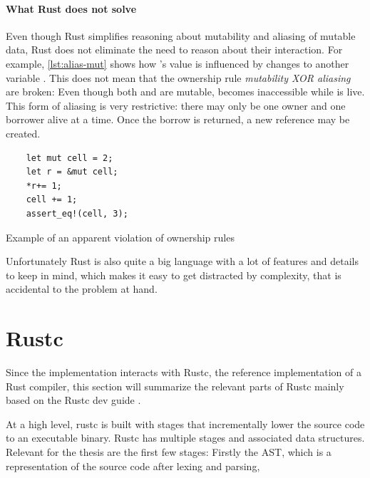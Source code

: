 \documentclass[twoside, english]{sdqthesis}
\theoremstyle{definition}
\begin{document}
\paragraph*{What Rust does not solve} Even though Rust simplifies reasoning about mutability and aliasing of mutable data, Rust does not eliminate the need to reason about their interaction. For example, \cref{lst:alias-mut} shows how 's value is influenced by changes to another variable . This does not mean that the ownership rule  \textit{mutability XOR aliasing} are broken: Even though both  and  are mutable,  becomes inaccessible while  is live.
This form of aliasing is very restrictive: there may only be one owner and one borrower alive at a time. Once the borrow is returned, a new reference may be created.

\begin{listing}[h]
  \begin{verbatim}
    let mut cell = 2;
    let r = &mut cell;
    *r+= 1;
    cell += 1;
    assert_eq!(cell, 3);
  \end{verbatim}
  \caption{Example of an apparent violation of ownership rules}
  \label{lst:alias-mut}
\end{listing}

Unfortunately Rust is also quite a big language with a lot of features and details to keep in mind, which makes it easy to get distracted by complexity, that is accidental to the problem at hand.

\section{Rustc}

Since the implementation interacts with Rustc, the reference implementation of a Rust compiler, this section will summarize the relevant parts of Rustc mainly based on the Rustc dev guide \cite{noauthor_overview_nodate}.

At a high level, rustc is built with stages that incrementally lower the source code to an executable binary. Rustc has multiple stages and associated data structures. 
Relevant for the thesis are the first few stages: Firstly the AST, which is a representation of the source code after lexing and parsing, 
\end{document}
